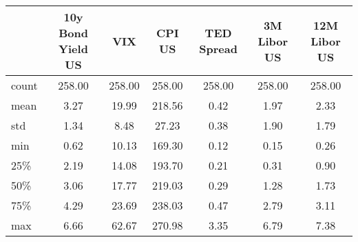 \begin{tabular}{lcccccc}
\toprule
{} &  10y Bond Yield US &     VIX &  CPI US &  TED Spread &  3M Libor US &  12M Libor US \\
\midrule
count &             258.00 &  258.00 &  258.00 &      258.00 &       258.00 &        258.00 \\
mean  &               3.27 &   19.99 &  218.56 &        0.42 &         1.97 &          2.33 \\
std   &               1.34 &    8.48 &   27.23 &        0.38 &         1.90 &          1.79 \\
min   &               0.62 &   10.13 &  169.30 &        0.12 &         0.15 &          0.26 \\
25\%   &               2.19 &   14.08 &  193.70 &        0.21 &         0.31 &          0.90 \\
50\%   &               3.06 &   17.77 &  219.03 &        0.29 &         1.28 &          1.73 \\
75\%   &               4.29 &   23.69 &  238.03 &        0.47 &         2.79 &          3.11 \\
max   &               6.66 &   62.67 &  270.98 &        3.35 &         6.79 &          7.38 \\
\bottomrule
\end{tabular}
